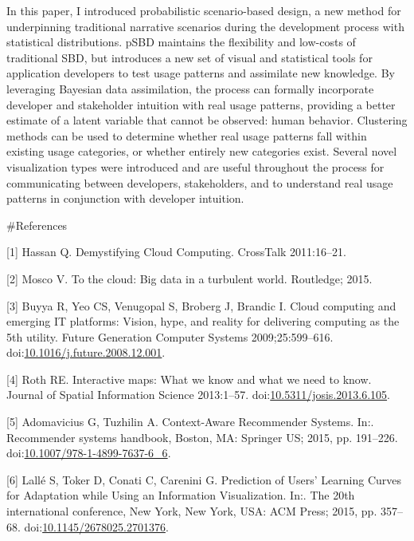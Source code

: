 \documentclass[]{article}
\begin{document}
In this paper, I introduced probabilistic scenario-based design, a new
method for underpinning traditional narrative scenarios during the
development process with statistical distributions. pSBD maintains the
flexibility and low-costs of traditional SBD, but introduces a new set
of visual and statistical tools for application developers to test usage
patterns and assimilate new knowledge. By leveraging Bayesian data
assimilation, the process can formally incorporate developer and
stakeholder intuition with real usage patterns, providing a better
estimate of a latent variable that cannot be observed: human behavior.
Clustering methods can be used to determine whether real usage patterns
fall within existing usage categories, or whether entirely new
categories exist. Several novel visualization types were introduced and
are useful throughout the process for communicating between developers,
stakeholders, and to understand real usage patterns in conjunction with
developer intuition.

\pagebreak
\#References

\hypertarget{refs}{}
\hypertarget{ref-Hassan:2011uh}{}
{[}1{]} Hassan Q. Demystifying Cloud Computing. CrossTalk 2011:16--21.

\hypertarget{ref-Mosco:2014cu}{}
{[}2{]} Mosco V. To the cloud: Big data in a turbulent world. Routledge;
2015.

\hypertarget{ref-Buyya:2009ix}{}
{[}3{]} Buyya R, Yeo CS, Venugopal S, Broberg J, Brandic I. Cloud
computing and emerging IT platforms: Vision, hype, and reality for
delivering computing as the 5th utility. Future Generation Computer
Systems 2009;25:599--616.
doi:\href{https://doi.org/10.1016/j.future.2008.12.001}{10.1016/j.future.2008.12.001}.

\hypertarget{ref-Roth:2013fv}{}
{[}4{]} Roth RE. Interactive maps: What we know and what we need to
know. Journal of Spatial Information Science 2013:1--57.
doi:\href{https://doi.org/10.5311/josis.2013.6.105}{10.5311/josis.2013.6.105}.

\hypertarget{ref-Adomavicius:2015fx}{}
{[}5{]} Adomavicius G, Tuzhilin A. Context-Aware Recommender Systems.
In:. Recommender systems handbook, Boston, MA: Springer US; 2015, pp.
191--226.
doi:\href{https://doi.org/10.1007/978-1-4899-7637-6_6}{10.1007/978-1-4899-7637-6\_6}.

\hypertarget{ref-Lalle:2015hfa}{}
{[}6{]} Lallé S, Toker D, Conati C, Carenini G. Prediction of Users'
Learning Curves for Adaptation while Using an Information Visualization.
In:. The 20th international conference, New York, New York, USA: ACM
Press; 2015, pp. 357--68.
doi:\href{https://doi.org/10.1145/2678025.2701376}{10.1145/2678025.2701376}.
\end{document}
